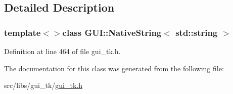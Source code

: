 \subsection{Detailed Description}
\subsubsection*{template$<$$>$class G\-U\-I\-::\-Native\-String$<$ std\-::string $>$}



Definition at line 464 of file gui\-\_\-tk.\-h.



The documentation for this class was generated from the following file\-:\begin{DoxyCompactItemize}
\item 
src/libs/gui\-\_\-tk/\hyperlink{gui__tk_8h}{gui\-\_\-tk.\-h}\end{DoxyCompactItemize}
